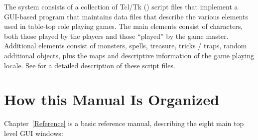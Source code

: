 The system consists of a collection of Tcl/Tk (\cite{Ousterhout94})
script files that implement a GUI-based program that maintains data
files that describe the various elements used in table-top
role playing games. The main elements consist of characters, both those
played by the players and those ``played'' by the game master.
Additional elements consist of monsters, spells, treasure, tricks /
traps, random additional objects, plus the maps and descriptive
information of the game playing locale.  See \cite{HellerRPGTcl09} for a
detailed description of these script files.

\section{How this Manual Is Organized}

Chapter~\ref{Reference} is a basic reference manual, describing the
eight main top level GUI windows:

